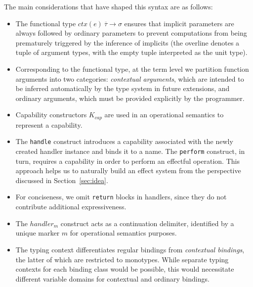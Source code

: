 \documentclass[acmsmall,review,screen]{acmart}
\newcommand{\ctx}[1]{ctx(#1)~}
\begin{document}
The main considerations that have shaped this syntax are as follows:
\begin{itemize}
    \item The functional type $\ctx{e}\overline{\tau}\to\sigma$ ensures that implicit parameters are always followed by ordinary parameters to prevent computations from being prematurely triggered by the inference of implicits (the overline denotes a tuple of argument types, with the empty tuple interpreted as the unit type).
    \item Corresponding to the functional type, at the term level we partition function arguments into two categories: \emph{contextual arguments}, which are intended to be inferred automatically by the type system in future extensions, and ordinary arguments, which must be provided explicitly by the programmer.
    \item Capability constructors $K_{cap}$ are used in an operational semantics to represent a capability. %
    \item  The \texttt{handle} construct introduces a capability associated with the newly created handler instance and binds it to a name.
    The \texttt{perform} construct, in turn, requires a capability in order to perform an effectful operation.
    This approach helps us to naturally build an effect system from the perspective discussed in Section~\ref{sec:idea}.
    \item For conciseness, we omit \texttt{return} blocks in handlers, since they do not contribute additional expressiveness.
    \item The $handler_m$ construct acts as a continuation delimiter, identified by a unique marker $m$ for operational semantics purposes.
    \item The typing context differentiates regular bindings from \emph{contextual bindings}, the latter of which are restricted to monotypes.
    While separate typing contexts for each binding class would be possible, this would necessitate different variable domains for contextual and ordinary bindings.
\end{itemize}
\end{document}
